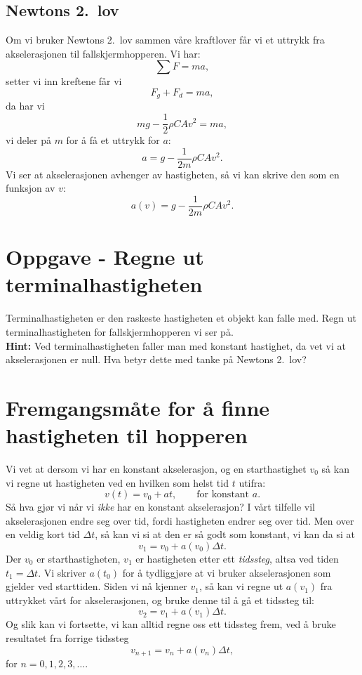 \documentclass[a4paper, 11pt, notitlepage, english]{article}
\begin{document}
\subsection*{Newtons 2.\ lov}

Om vi bruker Newtons 2.\ lov sammen våre kraftlover får vi et uttrykk fra akselerasjonen til fallskjermhopperen. Vi har:
$$\sum F = ma,$$
setter vi inn kreftene får vi
$$F_g + F_d = ma,$$
da har vi
$$mg - \frac{1}{2}\rho C A v^2 = ma,$$
vi deler på $m$ for å få et uttrykk for $a$:
$$a = g - \frac{1}{2m}\rho C A v^2.$$
Vi ser at akselerasjonen avhenger av hastigheten, så vi kan skrive den som en funksjon av $v$:
$$a(v) = g - \frac{1}{2m}\rho C A v^2.$$

\section*{Oppgave - Regne ut terminalhastigheten}
Terminalhastigheten er den raskeste hastigheten et objekt kan falle med. Regn ut terminalhastigheten for fallskjermhopperen vi ser på. \\ 
\textbf{Hint:} Ved terminalhastigheten faller man med konstant hastighet, da vet vi at akselerasjonen er null. Hva betyr dette med tanke på Newtons 2.\ lov?

\clearpage

\section*{Fremgangsmåte for å finne hastigheten til hopperen}
Vi vet at dersom vi har en konstant akselerasjon, og en starthastighet $v_0$ så kan vi regne ut hastigheten ved en hvilken som helst tid $t$ utifra:
$$v(t) = v_0 + at, \qquad \mbox{for konstant } a.$$
Så hva gjør vi når vi \emph{ikke} har en konstant akselerasjon? I vårt tilfelle vil akselerasjonen endre seg over tid, fordi hastigheten endrer seg over tid. Men over en veldig kort tid $\Delta t$, så kan vi si at den er så godt som konstant, vi kan da si at
$$v_1 = v_0 + a(v_0) \Delta t.$$
Der $v_0$ er starthastigheten, $v_1$ er hastigheten etter ett \emph{tidssteg}, 
altsa ved tiden $t_1 = \Delta t$.
Vi skriver $a(t_0)$ for å tydliggjøre at vi bruker akselerasjonen som gjelder
 ved starttiden. Siden vi nå kjenner $v_1$, så kan vi regne ut $a(v_1)$ fra uttrykket vårt for akselerasjonen, og bruke denne til å gå et tidssteg til:
$$v_2 = v_1 + a(v_1) \Delta t.$$
Og slik kan vi fortsette, vi kan alltid regne oss ett tidssteg frem, ved å bruke resultatet fra forrige tidssteg
$$v_{n+1} = v_n + a(v_n)\Delta t,$$
for $n=0,1,2,3,\ldots$.
\end{document}
